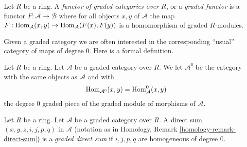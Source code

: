 \begin{definition}
\label{definition-functor-graded-categories}
Let $R$ be a ring. A {\it functor of graded categories over $R$}, or a
{\it graded functor}
is a functor $F : \mathcal{A} \to \mathcal{B}$ where for all objects
$x, y$ of $\mathcal{A}$ the map
$F : \mathop{\mathrm{Hom}}\nolimits_\mathcal{A}(x, y) \to \mathop{\mathrm{Hom}}\nolimits_\mathcal{A}(F(x), F(y))$
is a homomorphism of graded $R$-modules.
\end{definition}

\noindent
Given a graded category we are often interested in the
corresponding ``usual'' category of maps of degree $0$.
Here is a formal definition.

\begin{definition}
\label{definition-H0-of-graded-category}
Let $R$ be a ring. Let $\mathcal{A}$ be a graded category
over $R$. We let {\it $\mathcal{A}^0$} be the category with the
same objects as $\mathcal{A}$ and with
$$
\mathop{\mathrm{Hom}}\nolimits_{\mathcal{A}^0}(x, y) = \mathop{\mathrm{Hom}}\nolimits^0_\mathcal{A}(x, y)
$$
the degree $0$ graded piece of the graded module of morphisms of
$\mathcal{A}$.
\end{definition}

\begin{definition}
\label{definition-graded-direct-sum}
Let $R$ be a ring. Let $\mathcal{A}$ be a graded category over $R$.
A direct sum $(x, y, z, i, j, p, q)$ in $\mathcal{A}$ (notation as in
Homology, Remark \ref{homology-remark-direct-sum})
is a {\it graded direct sum} if $i, j, p, q$ are homogeneous
of degree $0$.
\end{definition}

